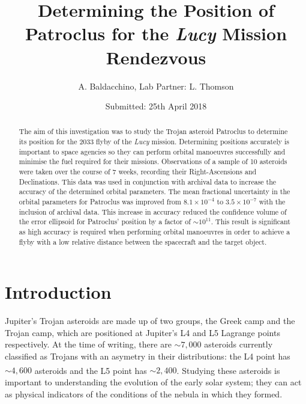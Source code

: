 \documentclass[10pt, twocolumn]{revtex4}    %
\begin{document}
                     

\title{Determining the Position of Patroclus for the \textit{Lucy} Mission Rendezvous} 
\date{Submitted: 25th April 2018}
\author{A. Baldacchino, Lab Partner: L. Thomson}

\begin{abstract}              

The aim of this investigation was to study the Trojan asteroid Patroclus to determine its position for the 2033 flyby of the \textit{Lucy} mission. Determining positions accurately is important to space agencies so they can perform orbital manoeuvres successfully and minimise the fuel required for their missions. Observations of a sample of 10 asteroids were taken over the course of 7 weeks, recording their Right-Ascensions and Declinations. This data was used in conjunction with archival data to increase the accuracy of the determined orbital parameters. The mean fractional uncertainty in the orbital parameters for Patroclus was improved from $8.1 \times 10^{-4}$ to $3.5 \times 10^{-7}$ with the inclusion of archival data. This increase in accuracy reduced the confidence volume of the error ellipsoid for Patroclus' position by a factor of ${\sim}10^{11}$. This result is significant as high accuracy is required when performing orbital manoeuvres in order to achieve a flyby with a low relative distance between the spacecraft and the target object. 

\end{abstract}

\maketitle
\thispagestyle{plain} %

\section{Introduction} 

Jupiter's Trojan asteroids are made up of two groups, the Greek camp and the Trojan camp, which are positioned at Jupiter's L4 and L5 Lagrange points respectively. At the time of writing, there are ${\sim}7{,}000$ asteroids currently classified as Trojans with an asymetry in their distributions: the L4 point has ${\sim}4{,}600$ asteroids and the L5 point has ${\sim}2{,}400$.\textsuperscript{\cite{ListJupiterTrojans}} Studying these asteroids is important to understanding the evolution of the early solar system; they can act as physical indicators of the conditions of the nebula in which they formed.
\end{document}
